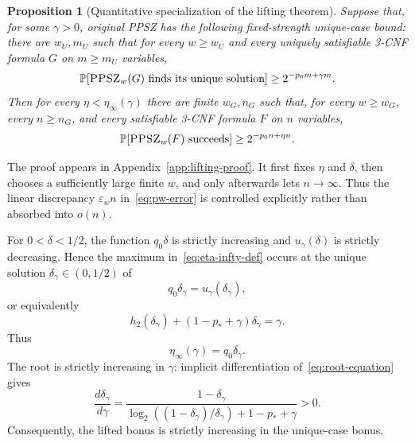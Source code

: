 \documentclass[11pt]{article}
\newtheorem{proposition}[theorem]{Proposition}
\newcommand{\PPSZ}{\textnormal{\textsc{PPSZ}}}
\newcommand{\eps}{\varepsilon}
\newcommand{\hbin}{h_2}
\newcommand{\Prb}{\mathbb P}
\begin{document}
\begin{proposition}[Quantitative specialization of the lifting theorem]\label{prop:quant-lift}
Suppose that, for some $\gamma>0$, original PPSZ has the following fixed-strength unique-case bound: there are $w_U,m_U$ such that for every $w\ge w_U$ and every uniquely satisfiable 3-CNF formula $G$ on $m\ge m_U$ variables,
\[
 \Prb[\PPSZ_w(G)\text{ finds its unique solution}]
 \ge 2^{-p_0m+\gamma m}.
\]
Then for every $\eta<\eta_\infty(\gamma)$ there are finite $w_G,n_G$ such that, for every $w\ge w_G$, every $n\ge n_G$, and every satisfiable 3-CNF formula $F$ on $n$ variables,
\[
 \Prb[\PPSZ_w(F)\text{ succeeds}]
 \ge 2^{-p_0n+\eta n}.
\]
\end{proposition}

The proof appears in Appendix~\ref{app:lifting-proof}.  It first fixes $\eta$ and $\delta$, then chooses a sufficiently large finite $w$, and only afterwards lets $n\to\infty$.  Thus the linear discrepancy $\eps_wn$ in~\eqref{eq:pw-error} is controlled explicitly rather than absorbed into $o(n)$.

For $0<\delta<1/2$, the function $q_0\delta$ is strictly increasing and $u_\gamma(\delta)$ is strictly decreasing.  Hence the maximum in~\eqref{eq:eta-infty-def} occurs at the unique solution $\delta_\gamma\in(0,1/2)$ of
\begin{equation}\label{eq:intersection}
 q_0\delta_\gamma=u_\gamma(\delta_\gamma),
\end{equation}
or equivalently
\begin{equation}\label{eq:root-equation}
 \hbin(\delta_\gamma)
 +(1-p_*+\gamma)\delta_\gamma
 =\gamma.
\end{equation}
Thus
\begin{equation}\label{eq:eta-root}
 \eta_\infty(\gamma)=q_0\delta_\gamma.
\end{equation}
The root is strictly increasing in $\gamma$: implicit differentiation of~\eqref{eq:root-equation} gives
\[
 \frac{d\delta_\gamma}{d\gamma}
 =\frac{1-\delta_\gamma}
 {\log_2((1-\delta_\gamma)/\delta_\gamma)+1-p_*+\gamma}>0.
\]
Consequently, the lifted bonus is strictly increasing in the unique-case bonus.
\end{document}
